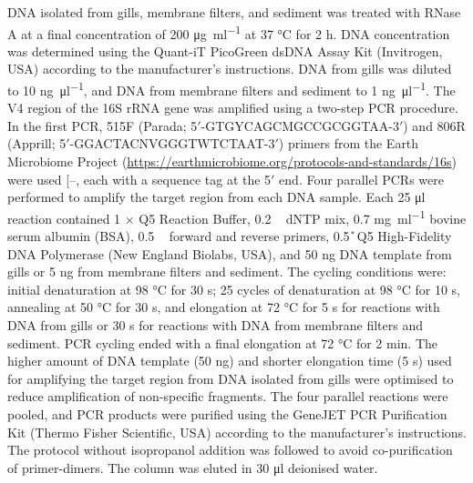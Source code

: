 \documentclass[
  12 pt,
]{article}
\begin{document}
DNA isolated from gills, membrane filters, and sediment was treated with RNase A at a final concentration of 200 \unit{\ug\per\ml} at 37 \unit{\degreeCelsius} for 2 \unit{\hour}. DNA concentration was determined using the Quant-iT PicoGreen dsDNA Assay Kit (Invitrogen, USA) according to the manufacturer's instructions. DNA from gills was diluted to 10 \unit{\ng\per\ul}, and DNA from membrane filters and sediment to 1 \unit{\ng\per\ul}. The V4 region of the 16S rRNA gene was amplified using a two-step PCR procedure. In the first PCR, 515F (Parada; 5\('\)-GTGYCAGCMGCCGCGGTAA-3\('\)) and 806R (Apprill; 5\('\)-GGACTACNVGGGTWTCTAAT-3\('\)) primers from the Earth Microbiome Project (\url{https://earthmicrobiome.org/protocols-and-standards/16s}) were used {[}--\citeproc{ref-Parada2016}{52}{]}, each with a sequence tag at the 5\('\) end. Four parallel PCRs were performed to amplify the target region from each DNA sample. Each 25 \unit{\ul} reaction contained 1 × Q5 Reaction Buffer, 0.2 \unit{\milli\Molar} dNTP mix, 0.7 \unit{\mg\per\ml} bovine serum albumin (BSA), 0.5 \unit{\micro\Molar} forward and
reverse primers, 0.5 \unit{\U} Q5 High-Fidelity DNA Polymerase (New England Biolabs, USA), and 50 \unit{\ng} DNA template from gills or 5 \unit{\ng} from membrane filters and sediment. The cycling conditions were: initial denaturation at 98 \unit{\degreeCelsius} for 30 \unit{\s}; 25 cycles of denaturation at 98 \unit{\degreeCelsius} for 10 \unit{\s}, annealing at 50 \unit{\degreeCelsius} for 30 \unit{\s}, and elongation at 72 \unit{\degreeCelsius} for 5 \unit{\s} for reactions with DNA from gills or 30 \unit{\s} for reactions with DNA from membrane filters and sediment. PCR cycling ended with a final elongation at 72 \unit{\degreeCelsius} for 2 \unit{\minute}. The higher amount of DNA template (50 \unit{\ng}) and shorter elongation time (5 \unit{\s}) used for amplifying the target region from DNA isolated from gills were optimised to reduce amplification of non-specific fragments. The four parallel reactions were pooled, and PCR products were purified using the GeneJET PCR Purification Kit (Thermo Fisher Scientific, USA) according to the manufacturer's instructions. The protocol without isopropanol addition was followed to avoid co-purification of primer-dimers. The column was eluted in 30 \unit{\ul} deionised water.
\end{document}
